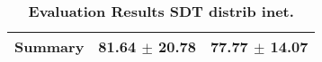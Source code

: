 \begin{table}[htb]
{\begin{tabular}{lll}
\midrule
\textbf{Summary                                  } &                  \phantom{0}81.64 $\pm$ 20.78 &                      \phantom{0}77.77 $\pm$ 14.07 \\
\bottomrule
\end{tabular}%
}
\caption{\textbf{Evaluation Results SDT distrib inet.}}
\label{tab:eval-results}
\end{table}


